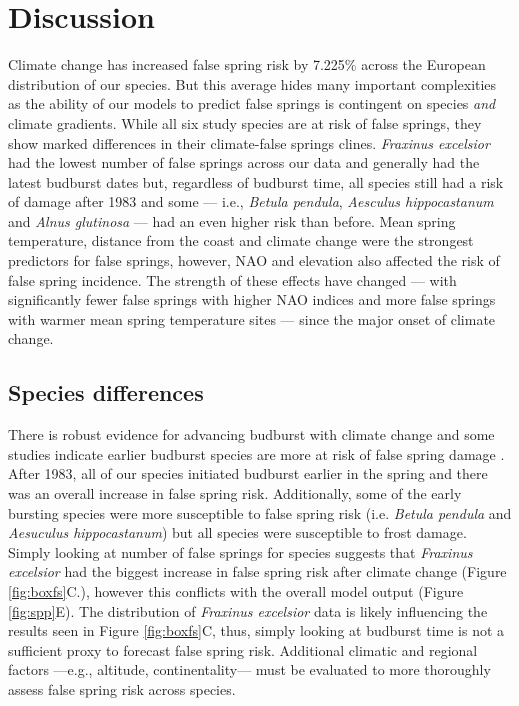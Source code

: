 \documentclass{article}\usepackage[]{graphicx}\usepackage[]{color}
\begin{document}
\section*{Discussion}
Climate change has increased false spring risk by 7.225\% across the European distribution of our species. But this average hides many important complexities as the ability of our models to predict false springs is contingent on species \textit{and} climate gradients. While all six study species are at risk of false springs, they show marked differences in their climate-false springs clines. \textit{Fraxinus excelsior} had the lowest number of false springs across our data and generally had the latest budburst dates but, regardless of budburst time, all species still had a risk of damage after 1983 and some  --- i.e., \textit{Betula pendula}, \textit{Aesculus hippocastanum} and \textit{Alnus glutinosa} --- had an even higher risk than before. Mean spring temperature, distance from the coast and climate change were the strongest predictors for false springs, however, NAO and elevation also affected the risk of false spring incidence. The strength of these effects have changed --- with significantly fewer false springs with higher NAO indices and more false springs with warmer mean spring temperature sites --- since the major onset of climate change. 

\subsection*{Species differences}
There is robust evidence for advancing budburst with climate change \citep{Cleland2007, IPCC2014, Wolkovich2012} and some studies indicate earlier budburst species are more at risk of false spring damage \citep{Ma2018}. After 1983, all of our species initiated budburst earlier in the spring and there was an overall increase in false spring risk. Additionally, some of the early bursting species were more susceptible to false spring risk (i.e. \textit{Betula pendula} and \textit{Aesuculus hippocastanum}) but all species were susceptible to frost damage. Simply looking at number of false springs for species suggests that \textit{Fraxinus excelsior} had the biggest increase in false spring risk after climate change (Figure \ref{fig:boxfs}C.), however this conflicts with the overall model output (Figure \ref{fig:spp}E). The distribution of \textit{Fraxinus excelsior} data is likely influencing the results seen in Figure \ref{fig:boxfs}C, thus, simply looking at budburst time is not a sufficient proxy to forecast false spring risk. Additional climatic and regional factors ---e.g., altitude, continentality--- must be evaluated to more thoroughly assess false spring risk across species.
  
\end{document}
